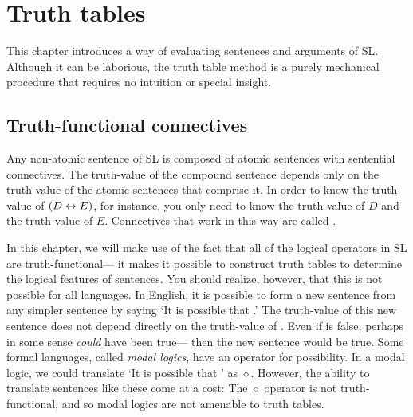 

\chapter{Truth tables}
\label{ch.TruthTables}

This chapter introduces a way of evaluating sentences and arguments of SL. Although it can be laborious, the truth table method is a purely mechanical procedure that requires no intuition or special insight.

\section{Truth-functional connectives}

Any non-atomic sentence of SL is composed of atomic sentences with sentential connectives. The truth-value of the compound sentence depends only on the truth-value of the atomic sentences that comprise it. In order to know the truth-value of $(D\leftrightarrow E)$, for instance, you only need to know the truth-value of $D$ and the truth-value of $E$. Connectives that work in this way are called .

In this chapter, we will make use of the fact that all of the logical operators in SL are truth-functional--- it makes it possible to construct truth tables to determine the logical features of sentences. You should realize, however, that this is not possible for all languages. In English, it is possible to form a new sentence from any simpler sentence  by saying `It is possible that .' The truth-value of this new sentence does not depend directly on the truth-value of . Even if  is false, perhaps in some sense  \emph{could} have been true--- then the new sentence would be true. Some formal languages, called \emph{modal logics}, have an operator for {possibility}. In a modal logic, we could translate `It is possible that ' as {\large $\diamond$}. However, the ability to translate sentences like these come at a cost: The {\large $\diamond$} operator is not truth-functional, and so modal logics are not amenable to truth tables.




